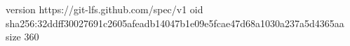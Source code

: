 version https://git-lfs.github.com/spec/v1
oid sha256:32ddff30027691c2605afeadb14047b1e09e5fcae47d68a1030a237a5d4365aa
size 360

